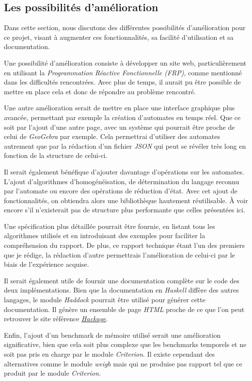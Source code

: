 \subsection{Les possibilités d'amélioration}

Dans cette section, nous discutons des différentes possibilités d'amélioration
pour ce projet, visant à augmenter ces fonctionnalités, sa facilité
d'utilisation et sa documentation.

Une possibilité d'amélioration consiste à développer un site web,
particulièrement en utilisant la \textit{Programmation Réactive Fonctionnelle
    (FRP)}, comme mentionné dans les difficultés rencontrées. Avec plus de temps, il
aurait pu être possible de mettre en place cela et donc de répondre au problème
rencontré.

\vphantom{}

Une autre amélioration serait de mettre en place une interface graphique plus
avancée, permettant par exemple la création d'automates en temps réel. Que ce
soit par l'ajout d'une autre page, avec un système qui pourrait être proche de
celui de \textit{GeoGebra} par exemple. Cela permettrai d'utiliser des automates
autrement que par la rédaction d'un fichier \textit{JSON} qui peut se révéler
très long en fonction de la structure de celui-ci.

\phantom{}

Il serait également bénéfique d'ajouter davantage d'opérations sur les
automates. L'ajout d'algorithmes d'homogénéisation, de détermination du langage
reconnu par l'automate ou encore des opérations de réduction d'état. Avec cet
ajout de fonctionnalités, on obtiendra alors une bibliothèque hautement
réutilisable. À voir encore s'il n'existerait pas de structure plus performante
que celles présentées ici.

\vphantom{}

Une spécification plus détaillée pourrait être fournie, en listant tous les
algorithmes utilisés et en introduisant des exemples pour faciliter la
compréhension du rapport. De plus, ce rapport technique étant l'un des premiers
que je rédige, la rédaction d'autre permettrais l'amélioration de celui-ci par
le biais de l'expérience acquise.

\vphantom{}

Il serait également utile de fournir une documentation complète sur le code des
deux implémentations. Bien que la documentation en \textit{Haskell} diffère des
autres langages, le module \textit{Haddock} pourrait être utilisé pour générer
cette documentation. Il génère un ensemble de page \textit{HTML} proche de ce
que l'on peut retrouver le site référence
\href{https://hackage.haskell.org/}{\textit{Hackage}}.

\vphantom{}

Enfin, l'ajout d'un benchmark de mémoire utilisé serait une amélioration
significative, bien que cela soit plus complexe que les benchmarks temporels et
ne soit pas pris en charge par le module \textit{Criterion}. Il existe cependant
des alternatives comme le module \textit{weigh} mais qui ne produise pas rapport
tel que ce produit par le module \textit{Criterion}.
